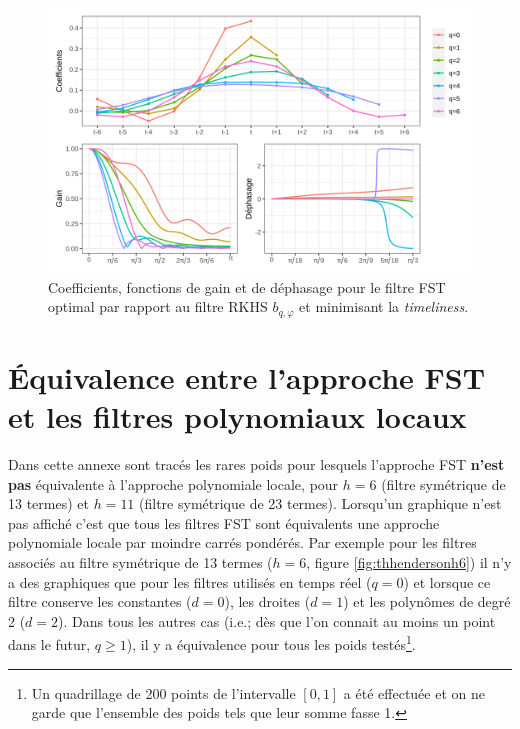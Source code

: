 \documentclass[
  11pt,
  french,
  a4paper]{article}
\newcommand\1{\mathds{1}}
\begin{document}
\begin{figure}[H]

{\centering \includegraphics[width=1\linewidth]{img/filters_used/fst_rkhs_timeliness} 

}

\caption[Coefficients, fonctions de gain et de déphasage pour le filtre FST optimal par rapport au filtre RKHS \(b_{q,\varphi}\) et minimisant la \emph{timeliness}]{Coefficients, fonctions de gain et de déphasage pour le filtre FST optimal par rapport au filtre RKHS \(b_{q,\varphi}\) et minimisant la \emph{timeliness}.}\label{fig:graphsfstrkhs}

\footnotesize
\normalsize\end{figure}

\newpage

\hypertarget{an-equivfstlp}{%
\section{Équivalence entre l'approche FST et les filtres polynomiaux locaux}\label{an-equivfstlp}}

Dans cette annexe sont tracés les rares poids pour lesquels l'approche FST \textbf{n'est pas} équivalente à l'approche polynomiale locale, pour \(h=6\) (filtre symétrique de 13 termes) et \(h=11\) (filtre symétrique de 23 termes).
Lorsqu'un graphique n'est pas affiché c'est que tous les filtres FST sont équivalents une approche polynomiale locale par moindre carrés pondérés.
Par exemple pour les filtres associés au filtre symétrique de 13 termes (\(h=6\), figure \ref{fig:thhendersonh6}) il n'y a des graphiques que pour les filtres utilisés en temps réel (\(q=0\)) et lorsque ce filtre conserve les constantes (\(d=0\)), les droites (\(d=1\)) et les polynômes de degré 2 (\(d=2\)).
Dans tous les autres cas (i.e.; dès que l'on connait au moins un point dans le futur, \(q\geq 1\)), il y a équivalence pour tous les poids testés\footnote{
  Un quadrillage de 200 points de l'intervalle \([0,1]\) a été effectuée et on ne garde que l'ensemble des poids tels que leur somme fasse 1.}.
\end{document}
